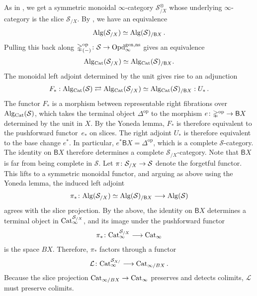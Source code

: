 \documentclass[10pt]{amsart}
\numberwithin{equation}{section}
\theoremstyle{definition}
\DeclareMathOperator{\op}{op}
\newcommand{\Cat}{\mathrm{Cat}\vphantom{t}}
\newcommand{\Alg}{\mathrm{Alg}\vphantom{z}}
\newcommand{\Simp}{\mathbb{\Delta}}
\newcommand{\cS}{\mathcal{S}}
\newcommand{\cL}{\mathcal{L}}
\newcommand{\sfB}{\mathsf{B}}
\newcommand{\Opd}{\mathrm{Opd}^{\mathrm{gen,ns}}_{\infty}}
\renewcommand{\to}{\mathchoice{\longrightarrow}{\rightarrow}{}{}}
\begin{document}
	As in , we get a symmetric monoidal $\infty$-category $\cS_{/X}^{\otimes}$ whose underlying $\infty$-category is the slice $\cS_{/X}$.
  By , we have an equivalence
	\begin{align*}
		\Alg(\cS_{/X}) \simeq \Alg(\cS)_{/\sfB X}\,.
	\end{align*}
	Pulling this back along $\Simp^{\op}_{(-)}\colon \cS \to \Opd$ gives an equivalence
	\begin{align*}
		\Alg_{\Cat}(\cS_{/X}) \simeq \Alg_{\Cat}(\cS)_{/\sfB X}.
	\end{align*}
	The monoidal left adjoint determined by the unit gives rise to an adjunction
	\begin{align*}
		F_{*} :  \Alg_{\Cat}(\cS) \rightleftarrows \Alg_{\Cat}(\cS_{/X}) \simeq \Alg_{\Cat}(\cS)_{/\sfB X} : U_{*} \,.
	\end{align*}
	The functor $F_{*}$ is a morphism between representable right fibrations over $\Alg_{\Cat}(\cS)$, which takes the terminal object $\Simp^{\op}$ to the morphism $e\colon \Simp^{\op} \to \sfB X$ determined by the unit in $X$.
  By the Yoneda lemma, $F_{*}$ is therefore equivalent to the pushforward functor~$e_{*}$ on slices. The right adjoint $U_{*}$ is therefore equivalent to the base change $e^{*}$.
	In particular, $e^{*}\sfB X = \Simp^{\op}$, which is a complete $\cS$-category.
  The identity on $\sfB X$ therefore determines a complete $\cS_{/X}$-category. Note that $\sfB X$ is far from being complete in $\cS$.
	Let $\pi\colon \cS_{/X} \to \cS$ denote the forgetful functor. This lifts to a symmetric monoidal functor, and arguing as above using the Yoneda lemma, the induced left adjoint
	\begin{align*}
		\pi_{*} \colon \Alg(\cS_{/X}) \simeq \Alg(\cS)_{/\sfB X} \to \Alg(\cS)
	\end{align*}
	agrees with the slice projection.
  By the above, the identity on $\sfB X$ determines a terminal object in $\Cat_{\infty}^{\cS_{/X}}$, and its image under the pushforward functor
	\begin{align*}
		\pi_{*}\colon \Cat^{\cS_{/X}}_{\infty} \to \Cat_{\infty}
	\end{align*}
	is the space $BX$. Therefore, $\pi_{*}$ factors through a functor
	\begin{align*}
		\cL \colon \Cat^{\cS_{X/}}_{\infty} \to \Cat_{\infty /BX} \,.
	\end{align*}
	Because the slice projection $\Cat_{\infty /BX} \to \Cat_{\infty}$ preserves and detects colimits, $\cL$ must preserve colimits.
\end{document}
